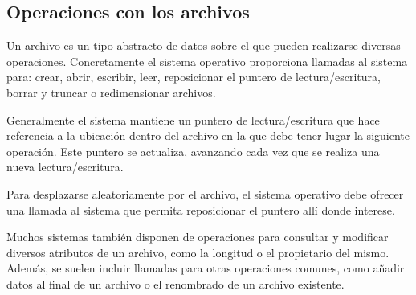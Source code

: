 \subsection{Operaciones con los
archivos}\label{_operaciones_con_los_archivos}

Un archivo es un tipo abstracto de datos sobre el que pueden realizarse
diversas operaciones. Concretamente el sistema operativo proporciona
llamadas al sistema para: crear, abrir, escribir, leer, reposicionar el
puntero de lectura/escritura, borrar y truncar o redimensionar archivos.

Generalmente el sistema mantiene un puntero de lectura/escritura que
hace referencia a la ubicación dentro del archivo en la que debe tener
lugar la siguiente operación. Este puntero se actualiza, avanzando cada
vez que se realiza una nueva lectura/escritura.

Para desplazarse aleatoriamente por el archivo, el sistema operativo
debe ofrecer una llamada al sistema que permita reposicionar el puntero
allí donde interese.

Muchos sistemas también disponen de operaciones para consultar y
modificar diversos atributos de un archivo, como la longitud o el
propietario del mismo. Además, se suelen incluir llamadas para otras
operaciones comunes, como añadir datos al final de un archivo o el
renombrado de un archivo existente.

